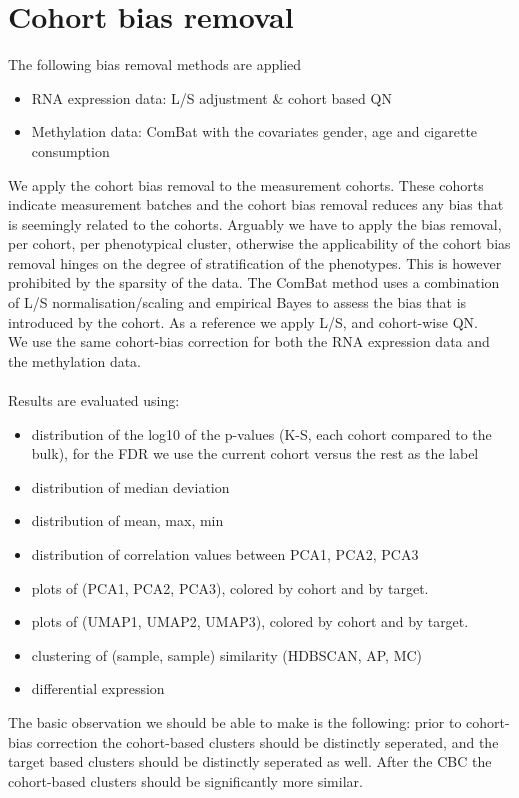 \documentclass[a4paper,10pt]{article}
\begin{document}
\section{Cohort bias removal}
%
The following bias removal methods are applied
%
\begin{itemize}
\item RNA expression data: L/S adjustment \& cohort based QN
\item Methylation data: ComBat with the covariates gender, age and cigarette consumption
\end{itemize}

We apply the cohort bias removal to the measurement cohorts. These cohorts indicate measurement batches and the cohort bias removal reduces any bias that is seemingly related to the cohorts. Arguably we have to apply the bias removal, per cohort, per phenotypical cluster, otherwise the applicability of the cohort bias removal hinges on the degree of stratification of the phenotypes. This is however prohibited by the sparsity of the data.
The ComBat method uses a combination of L/S normalisation/scaling and empirical Bayes to assess the bias that is introduced by the cohort. As a reference we apply L/S, and cohort-wise QN.  \\ 
%
We use the same cohort-bias correction for both the RNA expression data and the methylation data. \\ \\
%
Results are evaluated using:
\begin{itemize}
\item distribution of the log10 of the p-values (K-S, each cohort compared to the bulk), for the FDR we use the current cohort versus the rest as the label
\item distribution of median deviation
\item distribution of mean, max, min 
\item distribution of correlation values between PCA1, PCA2, PCA3
\item plots of (PCA1, PCA2, PCA3), colored by cohort and by target.
\item plots of (UMAP1, UMAP2, UMAP3), colored by cohort and by target.
\item clustering of (sample, sample) similarity (HDBSCAN, AP, MC)
\item differential expression
\end{itemize}
%

The basic observation we should be able to make is the following:
prior to cohort-bias correction the cohort-based clusters should be distinctly seperated, 
and the target based clusters should be distinctly seperated as well. After the CBC the cohort-based clusters
should be significantly more similar. 
\end{document}
